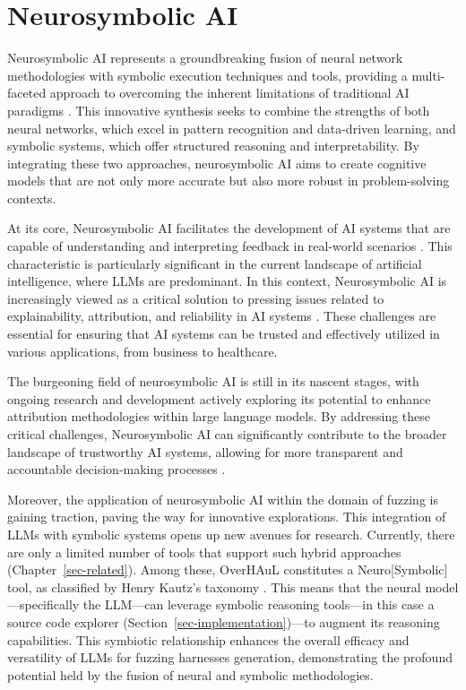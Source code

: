 \documentclass[
  a4paper,
]{scrreprt}
\theoremstyle{definition}
\theoremstyle{remark}
\begin{document}
\section{Neurosymbolic AI}\label{sec-nesy}

Neurosymbolic AI represents a groundbreaking fusion of neural network
methodologies with symbolic execution techniques and tools, providing a
multi-faceted approach to overcoming the inherent limitations of
traditional AI paradigms \autocite{sheth2023,garcez2020}. This
innovative synthesis seeks to combine the strengths of both neural
networks, which excel in pattern recognition and data-driven learning,
and symbolic systems, which offer structured reasoning and
interpretability. By integrating these two approaches, neurosymbolic AI
aims to create cognitive models that are not only more accurate but also
more robust in problem-solving contexts.

At its core, Neurosymbolic AI facilitates the development of AI systems
that are capable of understanding and interpreting feedback in
real-world scenarios \autocite{ganguly2024}. This characteristic is
particularly significant in the current landscape of artificial
intelligence, where LLMs are predominant. In this context, Neurosymbolic
AI is increasingly viewed as a critical solution to pressing issues
related to explainability, attribution, and reliability in AI systems
\autocite{gaur2023,tilwani2024}. These challenges are essential for
ensuring that AI systems can be trusted and effectively utilized in
various applications, from business to healthcare.

The burgeoning field of neurosymbolic AI is still in its nascent stages,
with ongoing research and development actively exploring its potential
to enhance attribution methodologies within large language models. By
addressing these critical challenges, Neurosymbolic AI can significantly
contribute to the broader landscape of trustworthy AI systems, allowing
for more transparent and accountable decision-making processes
\autocite{sheth2023,gaur2023,tilwani2024}.

Moreover, the application of neurosymbolic AI within the domain of
fuzzing is gaining traction, paving the way for innovative explorations.
This integration of LLMs with symbolic systems opens up new avenues for
research. Currently, there are only a limited number of tools that
support such hybrid approaches (Chapter~\ref{sec-related}). Among these,
OverHAuL constitutes a Neuro{[}Symbolic{]} tool, as classified by Henry
Kautz's taxonomy \autocite{sarker2022,kautz2020}. This means that the
neural model---specifically the LLM---can leverage symbolic reasoning
tools---in this case a source code explorer
(Section~\ref{sec-implementation})---to augment its reasoning
capabilities. This symbiotic relationship enhances the overall efficacy
and versatility of LLMs for fuzzing harnesses generation, demonstrating
the profound potential held by the fusion of neural and symbolic
methodologies.
\end{document}
